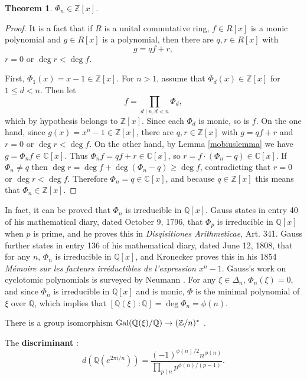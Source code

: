 \documentclass{amsart}
\newcommand{\Gal}{\ensuremath\mathrm{Gal}}
\newtheorem{theorem}{Theorem}
\theoremstyle{definition}
\begin{document}
\begin{theorem}
$\Phi_n \in \mathbb{Z}[x]$.
\label{Zx}
\end{theorem}
\begin{proof}
It is a fact that if $R$ is a unital commutative ring, $f \in R[x]$ is a monic polynomial and
$g \in R[x]$ is a polynomial, then there are $q,r \in R[x]$ with
\[
g = qf+r,
\]
$r=0$ or $\deg r < \deg f$.

First, $\Phi_1(x)=x-1 \in \mathbb{Z}[x]$. For $n>1$, assume that
$\Phi_d(x) \in \mathbb{Z}[x]$ for $1 \leq d < n$. Then let
\[
f = \prod_{d \mid n, d<n} \Phi_d,
\]
which by hypothesis belongs to $\mathbb{Z}[x]$. Since each $\Phi_d$ is monic, so is $f$. 
On the one hand,
since $g(x)=x^n-1 \in \mathbb{Z}[x]$, there are $q,r \in \mathbb{Z}[x]$ with
$g = q f + r$ and
$r=0$ or $\deg r < \deg f$.
On the other hand, by Lemma \ref{mobiuslemma} we have
$g = \Phi_n f \in \mathbb{C}[x]$. 
Thus $\Phi_n f = qf+r \in \mathbb{C}[x]$, 
so $r = f \cdot (\Phi_n - q) \in \mathbb{C}[x]$. If $\Phi_n \neq q$ then $\deg r = \deg f + \deg (\Phi_n-q) \geq \deg f$, contradicting that
$r=0$ or $\deg r < \deg f$. Therefore $\Phi_n = q \in \mathbb{C}[x]$, and because $q \in \mathbb{Z}[x]$ this means that
$\Phi_n \in \mathbb{Z}[x]$. 
\end{proof}

In fact, it can be proved that
$\Phi_n$ is irreducible in $\mathbb{Q}[x]$. Gauss states in entry 40 of his mathematical diary, dated
October 9, 1796, that 
$\Phi_p$ is irreducible in $\mathbb{Q}[x]$ when $p$ is prime, and he proves this
in {\em Disqisitiones Arithmeticae}, Art. 341.
Gauss further states in entry 136 of his mathematical diary, dated June 12, 1808, that for any $n$,
$\Phi_n$ is irreducible in $\mathbb{Q}[x]$, and Kronecker proves this in his
1854 {\em M\'emoire sur les facteurs irr\'eductibles de l'expression $x^n-1$}.
Gauss's work on cyclotomic polynomials is surveyed by Neumann \cite{neumannDA}.
For any $\xi \in \Delta_n$, $\Phi_n(\xi)=0$, and since $\Phi_n$ is irreducible in $\mathbb{Q}[x]$ and is monic, $\Phi$ is the minimal
polynomial of $\xi$ over $\mathbb{Q}$, which implies that $[\mathbb{Q}(\xi):\mathbb{Q}]=\deg \Phi_n=\phi(n)$.

There is a group isomorphism $\Gal(\mathbb{Q}(\xi)/\mathbb{Q}) \to (\mathbb{Z}/n)^*$ \cite[p.~596, Theorem 26]{dummit}.

The \textbf{discriminant} \cite[p.~12, Proposition 2.7]{washington}:
\[
d(\mathbb{Q}(e^{2\pi i/n})) = \frac{(-1)^{\phi(n)/2} n^{\phi(n)}}{\prod_{p \mid n} p^{\phi(n)/(p-1)}}. 
\]
\end{document}
